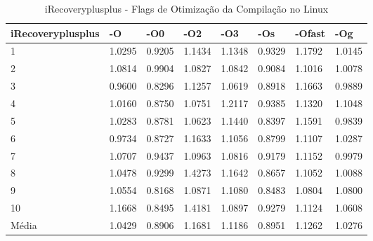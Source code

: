 \begin{table}[!ht]
\tiny
\centering
\caption{iRecoveryplusplus - Flags de Otimização da Compilação no Linux}
\label{tab:otimizacao_compilacao:linux:irecoveryplusplus}
\begin{tabular}{llllllll}
\textbf{iRecoveryplusplus} & \textbf{-O}  & \textbf{-O0}   & \textbf{-O2} & \textbf{-O3} & \textbf{-Os} & \textbf{-Ofast} & \textbf{-Og} \\ \toprule
1                          & 1.0295       &   0.9205       &  1.1434      &   1.1348     & 0.9329       &   1.1792        &  1.0145      \\ 
2                          & 1.0814       &   0.9904       &  1.0827      &   1.0842     & 0.9084       &   1.1016        &  1.0078      \\ 
3                          & 0.9600       &   0.8296       &  1.1257      &   1.0619     & 0.8918       &   1.1663        &  0.9889      \\ 
4                          & 1.0160       &   0.8750       &  1.0751      &   1.2117     & 0.9385       &   1.1320        &  1.1048      \\ 
5                          & 1.0283       &   0.8781       &  1.0623      &   1.1440     & 0.8397       &   1.1591        &  0.9839      \\ 
6                          & 0.9734       &   0.8727       &  1.1633      &   1.1056     & 0.8799       &   1.1107        &  1.0287      \\ 
7                          & 1.0707       &   0.9437       &  1.0963      &   1.0816     & 0.9179       &   1.1152        &  0.9979      \\ 
8                          & 1.0478       &   0.9299       &  1.4273      &   1.1642     & 0.8657       &   1.1052        &  1.0088      \\ 
9                          & 1.0554       &   0.8168       &  1.0871      &   1.1080     & 0.8483       &   1.0804        &  1.0800      \\ 
10                         & 1.1668       &   0.8495       &  1.4181      &   1.0897     & 0.9279       &   1.1124        &  1.0608      \\ \bottomrule
Média                      & 1.0429       &   0.8906       &  1.1681      &   1.1186     & 0.8951       &   1.1262        &  1.0276      \\ 
\end{tabular}
\end{table}

